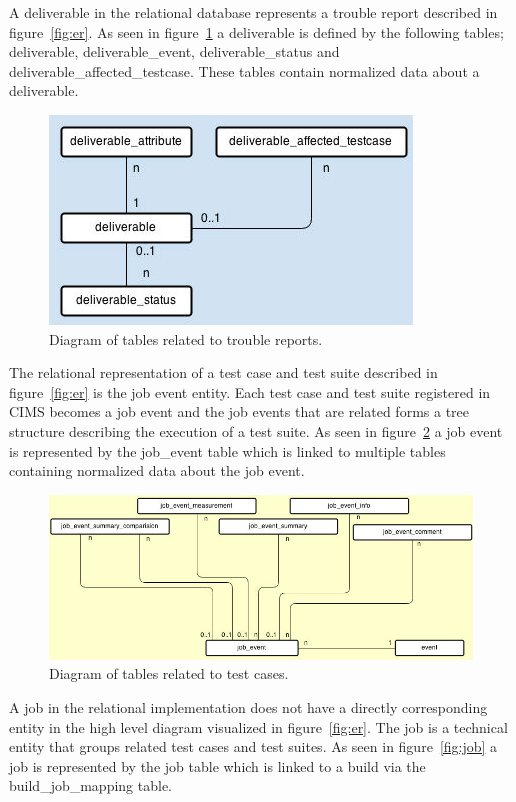 A deliverable in the relational database represents a trouble report described in figure~\ref{fig:er}. As seen in figure~\ref{fig:deliverable} a deliverable is defined by the following tables; deliverable, deliverable\_event, deliverable\_status and deliverable\_affected\_testcase. These tables contain normalized data about a deliverable. 
\begin{figure}[h!]
\centering
\includegraphics[scale=0.5]{figure/deliverable.jpg}
\caption{Diagram of tables related to trouble reports.}
\label{fig:deliverable}
\end{figure}

The relational representation of a test case and test suite described in figure~\ref{fig:er} is the job event entity. Each test case and test suite registered in CIMS becomes a job event and the job events that are related forms a tree structure describing the execution of a test suite. As seen in figure~\ref{fig:job_event} a job event is represented by the job\_event table which is linked to multiple tables containing normalized data about the job event.
\label{sec:jobEvent}
\begin{figure}[h!]
\centering
\includegraphics[scale=0.5]{figure/job_event.jpg}
\caption{Diagram of tables related to test cases.}
\label{fig:job_event}
\end{figure}


A job in the relational implementation does not have a directly corresponding entity in the high level diagram visualized in figure~\ref{fig:er}. The job is a technical entity that groups related test cases and test suites. As seen in figure~\ref{fig:job} a job is represented by the job table which is linked to a build via the build\_job\_mapping table. 

